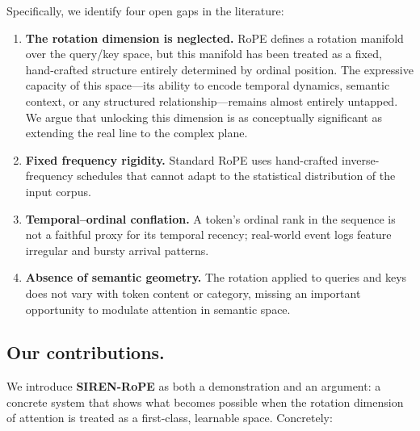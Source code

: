 \documentclass{article}
\begin{document}
Specifically, we identify four open gaps in the
literature:
\begin{enumerate}
  \item \textbf{The rotation dimension is neglected.} RoPE defines a rotation manifold over the query/key space, but this manifold has been treated as a fixed, hand-crafted structure entirely determined by ordinal position. The expressive capacity of this space---its ability to encode temporal dynamics, semantic context, or any structured relationship---remains almost entirely untapped. We argue that unlocking this dimension is as conceptually significant as extending the real line to the complex plane.
  \item \textbf{Fixed frequency rigidity.} Standard RoPE uses hand-crafted inverse-frequency schedules that cannot adapt to the statistical distribution of the input corpus.
  \item \textbf{Temporal–ordinal conflation.} A token's ordinal rank in the sequence is not a faithful proxy for its temporal recency; real-world event logs feature irregular and bursty arrival patterns.
  \item \textbf{Absence of semantic geometry.} The rotation applied to queries and keys does not vary with token content or category, missing an important opportunity to modulate attention in semantic space.
\end{enumerate}

\subsection{Our contributions.} We introduce \textbf{SIREN-RoPE} as both a demonstration and an argument: a concrete system that shows what becomes possible when the rotation dimension of attention is treated as a first-class, learnable space. Concretely:
\end{document}
